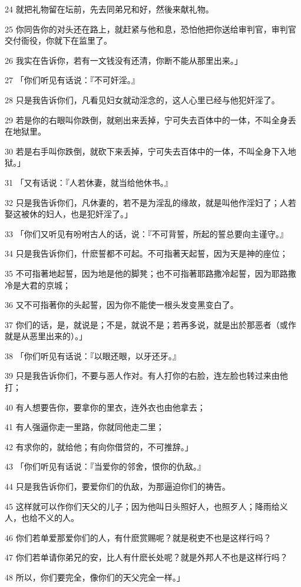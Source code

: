 \par 24 就把礼物留在坛前，先去同弟兄和好，然後来献礼物。
\par 25 你同告你的对头还在路上，就赶紧与他和息，恐怕他把你送给审判官，审判官交付衙役，你就下在监里了。
\par 26 我实在告诉你，若有一文钱没有还清，你断不能从那里出来。」
\par 27 「你们听见有话说：『不可奸淫。』
\par 28 只是我告诉你们，凡看见妇女就动淫念的，这人心里已经与他犯奸淫了。
\par 29 若是你的右眼叫你跌倒，就剜出来丢掉，宁可失去百体中的一体，不叫全身丢在地狱里。
\par 30 若是右手叫你跌倒，就砍下来丢掉，宁可失去百体中的一体，不叫全身下入地狱。」
\par 31 「又有话说：『人若休妻，就当给他休书。』
\par 32 只是我告诉你们，凡休妻的，若不是为淫乱的缘故，就是叫他作淫妇了；人若娶这被休的妇人，也是犯奸淫了。」
\par 33 「你们又听见有吩咐古人的话，说：『不可背誓，所起的誓总要向主谨守。』
\par 34 只是我告诉你们，什麽誓都不可起。不可指著天起誓，因为天是神的座位；
\par 35 不可指著地起誓，因为地是他的脚凳；也不可指著耶路撒冷起誓，因为耶路撒冷是大君的京城；
\par 36 又不可指著你的头起誓，因为你不能使一根头发变黑变白了。
\par 37 你们的话，是，就说是；不是，就说不是；若再多说，就是出於那恶者（或作就是从恶里出来的）。」
\par 38 「你们听见有话说：『以眼还眼，以牙还牙。』
\par 39 只是我告诉你们，不要与恶人作对。有人打你的右脸，连左脸也转过来由他打；
\par 40 有人想要告你，要拿你的里衣，连外衣也由他拿去；
\par 41 有人强逼你走一里路，你就同他走二里；
\par 42 有求你的，就给他；有向你借贷的，不可推辞。」
\par 43 「你们听见有话说：『当爱你的邻舍，恨你的仇敌。』
\par 44 只是我告诉你们，要爱你们的仇敌，为那逼迫你们的祷告。
\par 45 这样就可以作你们天父的儿子；因为他叫日头照好人，也照歹人；降雨给义人，也给不义的人。
\par 46 你们若单爱那爱你们的人，有什麽赏赐呢？就是税吏不也是这样行吗？
\par 47 你们若单请你弟兄的安，比人有什麽长处呢？就是外邦人不也是这样行吗？
\par 48 所以，你们要完全，像你们的天父完全一样。」

